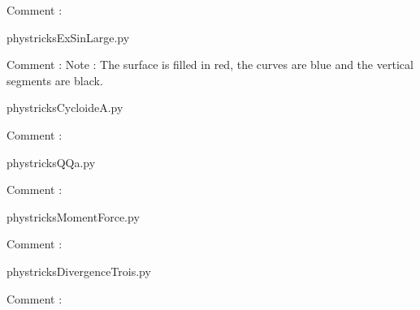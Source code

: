     Comment : 

    \clearpage
    


    \newcommand{\CaptionFigExSinLarge}{<+Type your caption here+>}
    \begin{center}
        
    \end{center}
    phystricksExSinLarge.py

    Comment : Note : The surface is filled in red, the curves are blue and the vertical segments are black.

    \clearpage
    


    \newcommand{\CaptionFigCycloideA}{<+Type your caption here+>}
    \begin{center}
        
    \end{center}
    phystricksCycloideA.py

    Comment : 

    \clearpage
    


    \newcommand{\CaptionFigQQa}{<+Type your caption here+>}
    \begin{center}
        
    \end{center}
    phystricksQQa.py

    Comment : 

    \clearpage
    


    \newcommand{\CaptionFigMomentForce}{<+Type your caption here+>}
    \begin{center}
        
    \end{center}
    phystricksMomentForce.py

    Comment : 

    \clearpage
    


    \newcommand{\CaptionFigDivergenceTrois}{<+Type your caption here+>}
    \begin{center}
        
    \end{center}
    phystricksDivergenceTrois.py

    Comment : 

